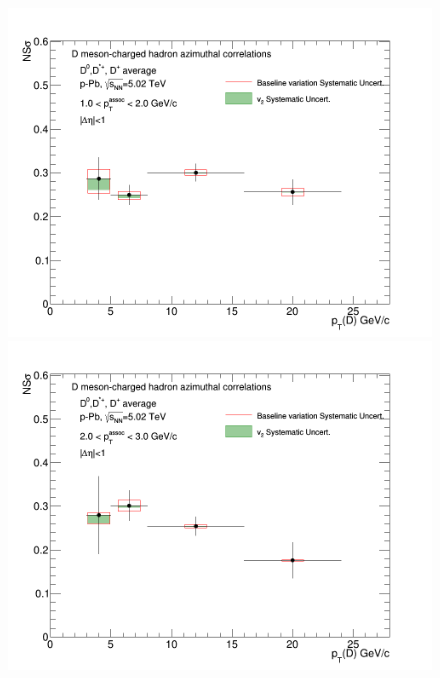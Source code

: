 \begin{figure}[!htbp]
{\includegraphics[width=0.49\linewidth, height=0.33\linewidth]{figures/FitOutput/CanvasFinalTrendNSSigma_pthad1dotto2dot.png}}
{\includegraphics[width=0.49\linewidth, height=0.33\linewidth]{figures/FitOutput/CanvasFinalTrendNSSigma_pthad2dotto3dot.png}}
\end{figure}
